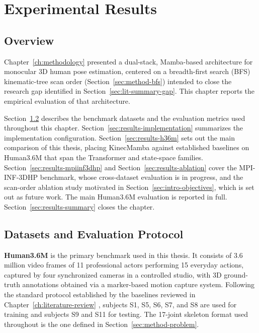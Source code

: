 \setlength{\footskip}{8mm}

\chapter{Experimental Results}
\label{ch:results}

\section{Overview}
\label{sec:results-overview}

Chapter~\ref{ch:methodology} presented a dual-stack, Mamba-based
architecture for monocular 3D human pose estimation, centered on a
breadth-first search (BFS) kinematic-tree scan order
(Section~\ref{sec:method-bfs}) intended to close the research gap
identified in Section~\ref{sec:lit-summary-gap}. This chapter reports the
empirical evaluation of that architecture.

Section~\ref{sec:results-protocol} describes the benchmark datasets and
the evaluation metrics used throughout this chapter.
Section~\ref{sec:results-implementation} summarizes the implementation
configuration. Section~\ref{sec:results-h36m} sets out the main comparison
of this thesis, placing KinecMamba against established baselines
on Human3.6M that span the Transformer and state-space families.
Section~\ref{sec:results-mpiinf3dhp} and Section~\ref{sec:results-ablation}
cover the MPI-INF-3DHP benchmark, whose cross-dataset evaluation is in
progress, and the scan-order ablation study motivated in
Section~\ref{sec:intro-objectives}, which is set out as future work. The main
Human3.6M evaluation is reported in full.
Section~\ref{sec:results-summary} closes the chapter.

\section{Datasets and Evaluation Protocol}
\label{sec:results-protocol}

\textbf{Human3.6M} \cite{ionescu2014human36m} is the primary benchmark used
in this thesis. It consists of 3.6 million video frames of 11 professional
actors performing 15 everyday actions, captured by four synchronized
cameras in a controlled studio, with 3D ground-truth annotations obtained
via a marker-based motion capture system. Following the standard protocol
established by the baselines reviewed in Chapter~\ref{ch:literature-review}
\cite{pavllo2019videopose3d, zheng2021poseformer, zhang2022mixste}, subjects
S1, S5, S6, S7, and S8 are used for training and subjects S9 and S11 for
testing. The 17-joint skeleton format used throughout is the one defined
in Section~\ref{sec:method-problem}.

